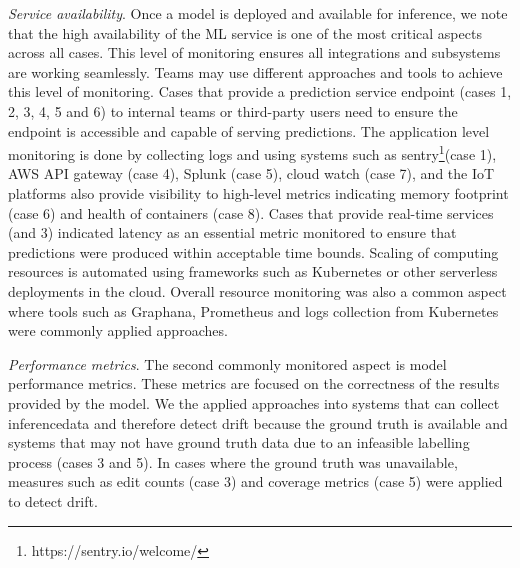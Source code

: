 \textit{Service availability}. Once a model is deployed and available for inference, we note that the high availability of the ML service is one of the most critical aspects across all cases. This level of monitoring ensures all integrations and subsystems are working seamlessly. Teams may use different approaches and tools to achieve this level of monitoring. Cases that provide a prediction service endpoint (cases 1, 2, 3, 4, 5 and 6) to internal teams or third-party users need to ensure the endpoint is accessible and capable of serving predictions. The application level monitoring is done by collecting logs and using systems such as sentry\footnote{https://sentry.io/welcome/}(case 1), AWS API gateway (case 4), Splunk (case 5), cloud watch (case 7), and the IoT platforms also provide visibility to high-level metrics indicating memory footprint (case 6) and health of containers (case 8).
Cases that provide real-time services (\DIFdelbegin {}\DIFdelend \DIFaddbegin {}\DIFaddend and 3) indicated latency as an essential metric monitored to ensure that predictions were produced within acceptable time bounds. Scaling of computing resources is automated using frameworks such as Kubernetes or other serverless deployments in the cloud. Overall resource monitoring was also a common aspect where tools such as Graphana, Prometheus and logs collection from Kubernetes were commonly applied approaches.

\textit{Performance metrics}. The second commonly monitored aspect is model performance metrics. These metrics are focused on the correctness of the results provided by the model. We \DIFdelbegin {}\DIFdelend \DIFaddbegin {}\DIFaddend the applied approaches into systems that can collect inference\DIFaddbegin \DIFadd{, }\DIFaddend data and therefore detect drift because the ground truth is available and systems that may not have ground truth data due to an infeasible labelling process (cases 3 and 5). In cases where the ground truth was unavailable, measures such as edit counts (case 3) and coverage metrics (case 5) were applied to detect drift. %


